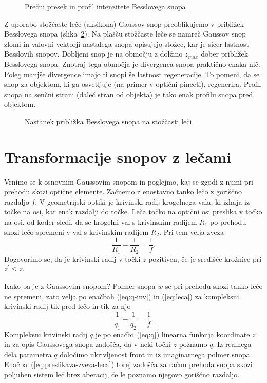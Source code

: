 \begin{figure}[h]
\centering
\def\svgwidth{70truemm} 

\caption{Prečni presek in profil intenzitete Besslovega snopa}
\label{fig:Besslov_presek}
\end{figure}

\begin{remark}
Z uporabo stožčaste leče (aksikona) Gaussov snop
preoblikujemo v približek Besslovega snopa (slika~\ref{fig:Bessel_leca}). 
Na plašču stožčaste leče se namreč Gaussov snop zlomi in valovni vektorji 
nastalega snopa opisujejo stožec, kar je sicer lastnost Besslovih snopov.
Dobljeni snop je na območju z dolžino $z_{max}$ dober približek Besslovega snopa.
Znotraj tega območja je divergenca snopa praktično enaka nič. Poleg manjše divergence
imajo ti snopi še lastnost regeneracije. To pomeni, da se snop 
za objektom, ki ga osvetljuje (na primer v optični pinceti), regenerira. 
Profil snopa na senčni strani (daleč stran od objekta) je tako enak profilu 
snopa pred objektom. 
\begin{figure}[h]
\centering
\def\svgwidth{90truemm} 

\caption{Nastanek približka Besslovega snopa na stožčasti leči}
\label{fig:Bessel_leca}
\end{figure}
\end{remark}

\section{Transformacije snopov z lečami}

Vrnimo se k osnovnim Gaussovim snopom in poglejmo, kaj se zgodi z njimi pri prehodu
skozi optične elemente. Začnemo
z enostavno tanko lečo z goriščno razdaljo $f$. V geometrijski optiki
je krivinski radij krogelnega vala, ki izhaja iz točke na osi, kar
enak razdalji do točke. Leča točko na optični osi preslika v točko na osi,
od koder sledi, da se krogelni val s krivinskim radijem $R_{1}$
po prehodu skozi lečo spremeni v val s krivinskim radijem $R_{2}$.
Pri tem velja zveza 
\begin{equation}
\frac{1}{R_{1}}-\frac{1}{R_{2}}=\frac{1}{f}.
\label{eq:leca}
\end{equation}
Dogovorimo se, da je krivinski radij v točki $z$ pozitiven, če je središče krožnice pri $z^{\prime}\le z$.

Kako pa je z Gaussovim snopom? Polmer snopa $w$ se pri prehodu 
skozi tanko lečo ne spremeni, zato velja po enačbah (\ref{eq:q-inv}) in 
(\ref{eq:leca}) za kompleksni krivinski radij tik pred lečo in tik za njo
\begin{equation}
\frac{1}{q_{1}}-\frac{1}{q_{2}}=\frac{1}{f}.
\label{eq:preslikava-zveza-leca}
\end{equation}
Kompleksni krivinski radij $q$ je po enačbi~(\ref{eq:q}) linearna 
funkcija koordinate $z$ in za opis Gaussovega snopa zadošča, da
v neki točki $z$ poznamo $q$. Iz realnega dela parametra $q$ določimo ukrivljenost front in iz 
imaginarnega polmer snopa. Enačba~(\ref{eq:preslikava-zveza-leca}) torej
zadošča za račun prehoda snopa skozi poljuben sistem leč brez aberacij, če le poznamo
njegovo goriščno razdaljo.

